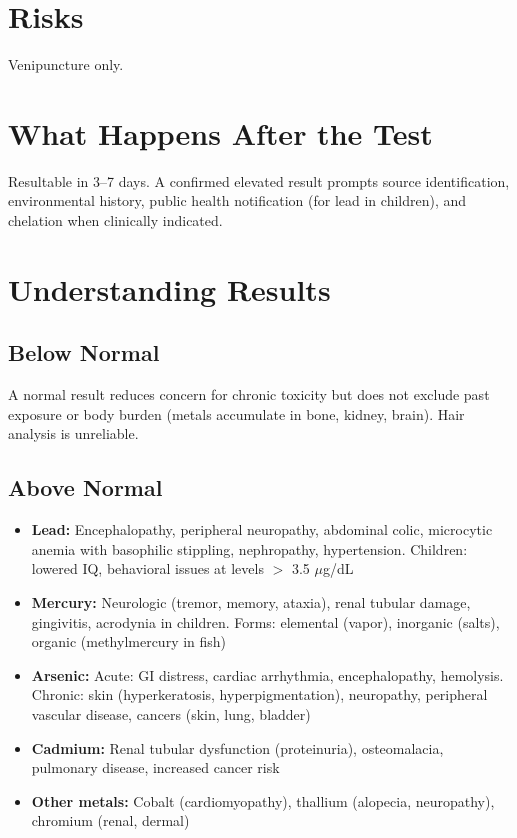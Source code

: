 \section*{Risks}
Venipuncture only.

\section*{What Happens After the Test}
Resultable in 3--7 days. A confirmed elevated result prompts source identification, environmental history, public health notification (for lead in children), and chelation when clinically indicated.

\section*{Understanding Results}

\subsection*{Below Normal}
A normal result reduces concern for chronic toxicity but does not exclude past exposure or body burden (metals accumulate in bone, kidney, brain). Hair analysis is unreliable.

\subsection*{Above Normal}
\begin{itemize}
  \item \textbf{Lead:} Encephalopathy, peripheral neuropathy, abdominal colic, microcytic anemia with basophilic stippling, nephropathy, hypertension. Children: lowered IQ, behavioral issues at levels $>$ 3.5 $\mu$g/dL
  \item \textbf{Mercury:} Neurologic (tremor, memory, ataxia), renal tubular damage, gingivitis, acrodynia in children. Forms: elemental (vapor), inorganic (salts), organic (methylmercury in fish)
  \item \textbf{Arsenic:} Acute: GI distress, cardiac arrhythmia, encephalopathy, hemolysis. Chronic: skin (hyperkeratosis, hyperpigmentation), neuropathy, peripheral vascular disease, cancers (skin, lung, bladder)
  \item \textbf{Cadmium:} Renal tubular dysfunction (proteinuria), osteomalacia, pulmonary disease, increased cancer risk
  \item \textbf{Other metals:} Cobalt (cardiomyopathy), thallium (alopecia, neuropathy), chromium (renal, dermal)
\end{itemize}


